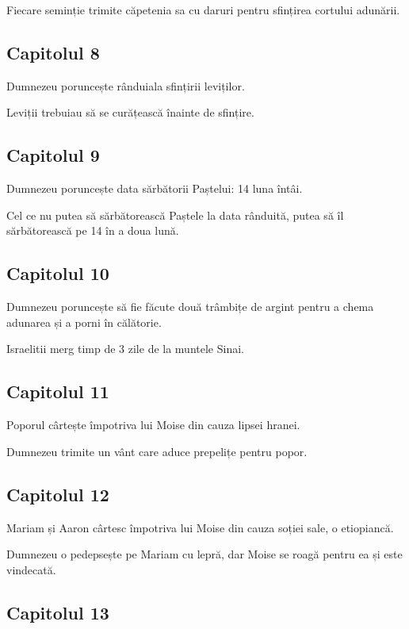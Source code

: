 \documentclass[12pt,a4paper]{article}
\begin{document}
Fiecare seminție trimite căpetenia sa cu daruri pentru sfințirea cortului adunării.

\subsection{Capitolul 8}

Dumnezeu poruncește rânduiala sfințirii leviților.

Leviții trebuiau să se curățească înainte de sfințire.

\subsection{Capitolul 9}

Dumnezeu poruncește data sărbătorii Paștelui: 14 luna întâi.

Cel ce nu putea să sărbătorească Paștele la data rânduită, putea să îl sărbătorească pe 14 în a doua lună.

\subsection{Capitolul 10}

Dumnezeu poruncește să fie făcute două trâmbițe de argint pentru a chema adunarea și a porni în călătorie.

Israelitii merg timp de 3 zile de la muntele Sinai.

\subsection{Capitolul 11}

Poporul cârtește împotriva lui Moise din cauza lipsei hranei.

Dumnezeu trimite un vânt care aduce prepelițe pentru popor.

\subsection{Capitolul 12}

Mariam și Aaron cârtesc împotriva lui Moise din cauza soției sale, o etiopiancă.

Dumnezeu o pedepsește pe Mariam cu lepră, dar Moise se roagă pentru ea și este vindecată.

\subsection{Capitolul 13}
\end{document}
